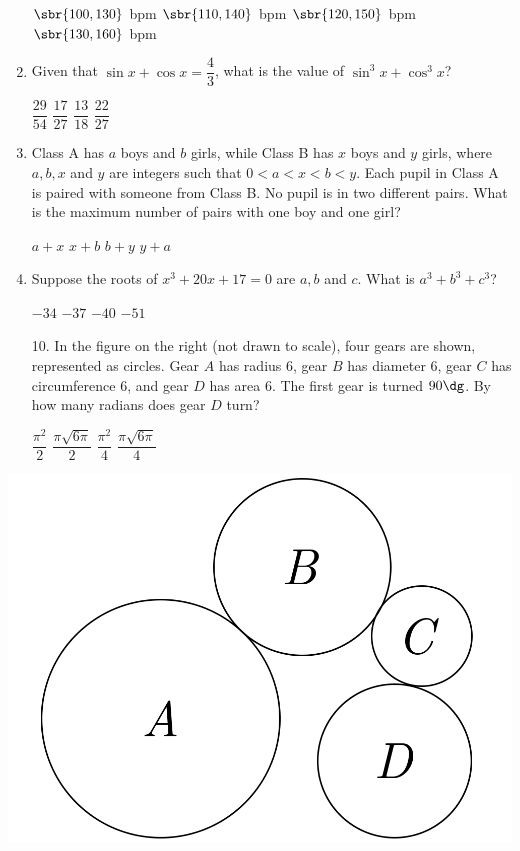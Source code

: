 \documentclass[11pt,paper=letter]{scrartcl}
\begin{document}
\begin{enumerate}
  \fourch
  {$\sbr{100, 130}$ bpm}
  {$\sbr{110, 140}$ bpm}
  {$\sbr{120, 150}$ bpm}
  {$\sbr{130, 160}$ bpm}

  \item Given that $\sin x + \cos x = \dfrac43$, what is the value of $\sin^3 x + \cos^3 x$?

  \fourch
  {$\dfrac{29}{54}$}
  {$\dfrac{17}{27}$}
  {$\dfrac{13}{18}$}
  {$\dfrac{22}{27}$}

  \item Class A has $a$ boys and $b$ girls, while Class B has $x$ boys and $y$ girls, where $a, b, x$ and $y$ are integers such that $0 < a < x < b < y$. Each pupil in Class A is paired with someone from Class B. No pupil is in two different pairs. What is the maximum number of pairs with one boy and one girl?

  \fourch
  {$a+x$}
  {$x+b$}
  {$b+y$}
  {$y+a$}

  \item Suppose the roots of $x^3 + 20x + 17 = 0$ are $a, b$ and $c$. What is $a^3 + b^3 + c^3$?

  \fourch
  {$-34$}
  {$-37$}
  {$-40$}
  {$-51$}
\end{enumerate}

\noindent
\begin{minipage}{0.7\textwidth}
  \begin{enumerate}
    \item[10.] In the figure on the right (not drawn to scale), four gears are shown, represented as circles. Gear $A$ has radius $6$, gear $B$ has diameter $6$, gear $C$ has circumference $6$, and gear $D$ has area $6$. The first gear is turned $90\dg$. By how many radians does gear $D$ turn?

    \fourch
    {$\dfrac{\pi^2}2$}
    {$\dfrac{\pi\sqrt{6\pi}}2$}
    {$\dfrac{\pi^2}4$}
    {$\dfrac{\pi\sqrt{6\pi}}4$}
  \end{enumerate}
\end{minipage}%
\begin{minipage}{0.3\textwidth}
  \begin{center}
    \includegraphics[width=\textwidth]{f1.png}
  \end{center}
\end{minipage}
\end{document}
